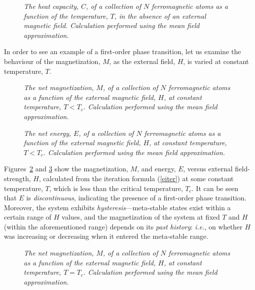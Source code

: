 \begin{figure}
\epsfysize=3in
\centerline{}
\caption{\em  The heat capacity, $C$, of a collection of $N$ ferromagnetic atoms as a
function of the temperature, $T$, in the absence of an external magnetic
field. Calculation performed using the mean field approximation.}\label{ising3}
\end{figure}

In order to see an example of a first-order phase transition, let us examine
the behaviour of the magnetization, $M$, as the external field, $H$, is
varied at constant temperature, $T$. 

\begin{figure}
\epsfysize=3in
\centerline{}
\caption{\em  The net magnetization, $M$, of a collection of $N$ ferromagnetic atoms as a
function of the external magnetic field, $H$, at constant temperature, $T<T_c$.
 Calculation performed using the mean field approximation.}\label{bs4}
\end{figure}

\begin{figure}
\epsfysize=3in
\centerline{}
\caption{\em The net energy, $E$, of a collection of $N$ ferromagnetic atoms as a
function of the external magnetic field, $H$, at constant temperature, $T<T_c$.
 Calculation performed using the mean field approximation.
}\label{bs3}
\end{figure}

Figures~\ref{bs4} and \ref{bs3} show the magnetization, $M$, and energy, $E$, versus
external field-strength, $H$, calculated from the iteration formula (\ref{eiter})
at some constant temperature, $T$, which is less
than the critical temperature, $T_c$. It can be seen that $E$ is
{\em discontinuous}, indicating the presence of a first-order phase transition.
Moreover, the system exhibits {\em hysteresis}---meta-stable
states exist within a certain range of $H$ values, and the magnetization of the system
at fixed $T$ and $H$ (within the aforementioned range) depends on its {\em past history}:
{\em i.e.}, on whether $H$ was increasing or decreasing when it entered the meta-stable
range.

\begin{figure}
\epsfysize=3in
\centerline{}
\caption{\em  The net magnetization, $M$, of a collection of $N$ ferromagnetic atoms as a
function of the external magnetic field, $H$, at constant temperature, $T=T_c$.
 Calculation performed using the mean field approximation.}\label{bs2}
\end{figure}

